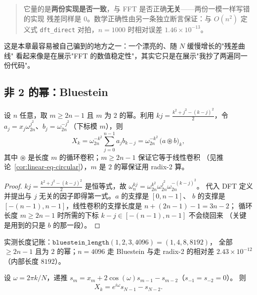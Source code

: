 \begin{quote}
它量的是\textbf{两份实现是否一致}，与 FFT 是否正确\textbf{无关}——两份一模一样写错的实现
残差同样是 $0$。数学正确性由另一条独立断言保证：与 $O(n^2)$ 定义式
\texttt{dft\_direct} 对拍，$n=1000$ 时相对误差 $1.46\times10^{-13}$。
\end{quote}

这是本章最容易被自己骗到的地方之一：一个漂亮的、随 $N$ 缓慢增长的"残差曲线"
看起来像是在展示"FFT 的数值稳定性"，其实它只是在展示"我抄了两遍同一份代码"。

\subsection{非 2 的幂：Bluestein}

\begin{theorem}
\label{thm:bluestein}
设 $n$ 任意，取 $m\ge 2n-1$ 且 $m$ 为 $2$ 的幂。利用
$kj=\tfrac{k^2+j^2-(k-j)^2}{2}$，令
$a_j=x_j\omega_{2n}^{j^2}$、$b_j=\omega_{2n}^{-j^2}$（下标模 $m$），则
\[
X_k=\omega_{2n}^{-k^2}\sum_{j=0}^{n-1}a_jb_{k-j}
=\omega_{2n}^{-k^2}\,\bigl(a\circledast b\bigr)_k ,
\]
其中 $\circledast$ 是长度 $m$ 的循环卷积；$m\ge2n-1$ 保证它等于线性卷积
（见推论~\ref{cor:linear-eq-circular}），$m$ 是 $2$ 的幂保证用 radix-2 算。
\end{theorem}

\begin{proof}
$kj=\frac{k^2+j^2-(k-j)^2}{2}$ 是恒等式，故
$\omega_n^{kj}=\omega_{2n}^{k^2}\omega_{2n}^{j^2}\omega_{2n}^{-(k-j)^2}$。
代入 DFT 定义并提出与 $j$ 无关的因子即得第一式。$a$ 的支撑是 $[0,n-1]$、
$b$ 的支撑是 $[-(n-1),n-1]$，线性卷积的支撑长度是 $n+(2n-1)-1=3n-2$；
循环长度 $m\ge2n-1$ 时所需的下标 $k-j\in[-(n-1),n-1]$ 不会绕回来
（关键是用到的只是 $b$ 的那一段）。
\end{proof}

实测长度记账：$\texttt{bluestein\_length}(1,2,3,4096)=(1,4,8,8192)$，
全部 $\ge2n-1$ 且为 $2$ 的幂；$n=4096$ 走 Bluestein 与走 radix-2 的相对差
$2.43\times10^{-12}$（内部长度 $8192$）。

\begin{corollary}
\label{cor:goertzel}
设 $\omega=2\pi k/N$，递推 $s_m=x_m+2\cos(\omega)s_{m-1}-s_{m-2}$（$s_{-1}=s_{-2}=0$）。
则
\[
X_k=e^{i\omega}s_{N-1}-s_{N-2}.
\]
\end{corollary}

